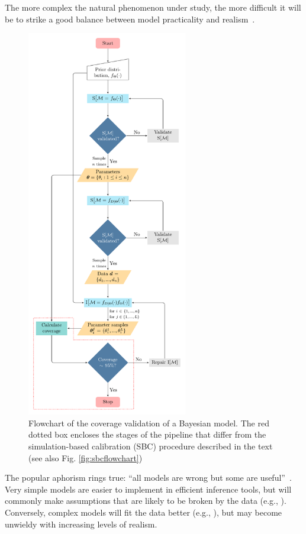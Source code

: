 \documentclass[oneside]{article}
\begin{document}
The more complex the natural phenomenon under study, the more difficult it will be to strike a good balance between model practicality and realism~\citep{levins1966}.
\begin{figure}
  \includegraphics[width=7cm]{../figures/flowchart.pdf}
  \caption{Flowchart of the coverage validation of a Bayesian
    model. The red dotted box encloses the stages of the pipeline that
  differ from the simulation-based calibration (SBC) procedure
  described in the text (see also Fig. \ref{fig:sbcflowchart})}
    \label{fig:flowchart}
\end{figure}
The popular aphorism rings true: ``all models are wrong but some are useful''~\citep{box79}.
Very simple models are easier to implement in efficient inference tools, but will commonly make assumptions that are likely to be broken by the data (e.g., \citealp{sullivan97,mendes17,mendes19}). 
Conversely, complex models will fit the data better (e.g., \citealp{ogilvie22}), but may become unwieldy with increasing levels of realism.
\end{document}
